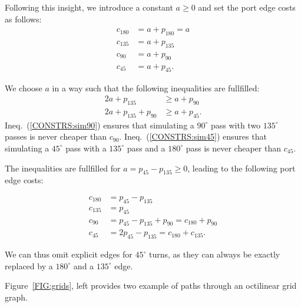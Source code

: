 \documentclass{sig-alternate-sigmod09}
\begin{document}
Following this insight, we introduce a constant $a \geq 0$ and set the port edge costs as follows:
\begin{align}
c_{180} &= a + p_{180} = a \\
c_{135} &= a + p_{135} \\
c_{90} &= a + p_{90} \\
c_{45} &= a + p_{45}.
\end{align}

We choose $a$ in a way such that the following inequalities are fullfilled:
\begin{align}
2a + p_{135} &\geq a + p_{90} \label{CONSTRS:sim90}\\
2a + p_{135} + p_{90} &\geq a + p_{45}\label{CONSTRS:sim45}.
\end{align}
Ineq.~(\ref{CONSTRS:sim90}) ensures that simulating a $90^{\circ}$ pass with two $135^{\circ}$ passes is never cheaper than $c_{90}$. Ineq.~(\ref{CONSTRS:sim45}) ensures that simulating a $45^{\circ}$ pass with a $135^{\circ}$ pass and a $180^{\circ}$ pass is never cheaper than $c_{45}$.

The inequalities are fullfilled for $a = p_{45} - p_{135} \geq 0$, leading to the following port edge costs:

\begin{align}
c_{180} &= p_{45} - p_{135} \\
c_{135} &= p_{45} \\
c_{90} &= p_{45} - p_{135} + p_{90} = c_{180} + p_{90} \\
c_{45} &= 2 p_{45} - p_{135} = c_{180} + c_{135}.
\end{align}

We can thus omit explicit edges for $45^{\circ}$ turns, as they can always be exactly replaced by a $180^{\circ}$ and a $135^{\circ}$ edge.

Figure~\ref{FIG:grids}, left provides two example of paths through an octilinear grid graph.
\end{document}
